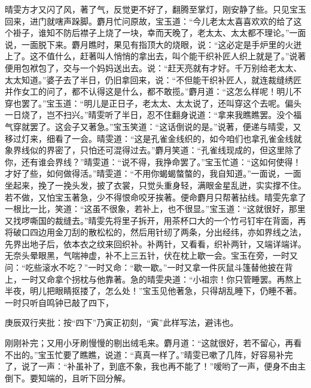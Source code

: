 \begin{parag}


    晴雯方才又闪了风，著了气，反觉更不好了，翻腾至掌灯，刚安静了些。只见宝玉回来，进门就嗐声跺脚。麝月忙问原故，宝玉道：“今儿老太太喜喜欢欢的给了这个褂子，谁知不防后襟子上烧了一块，幸而天晚了，老太太、太太都不理论。”一面说，一面脱下来。麝月瞧时，果见有指顶大的烧眼，说：“这必定是手炉里的火迸上了。这不值什么，赶著叫人悄悄的拿出去，叫个能干织补匠人织上就是了。”说著便用包袱包了，交与一个妈妈送出去。说：“赶天亮就有才好。千万别给老太太、太太知道。”婆子去了半日，仍旧拿回来，说：“不但能干织补匠人，就连裁缝绣匠并作女工的问了，都不认得这是什么，都不敢揽。”麝月道：“这怎么样呢！明儿不穿也罢了。”宝玉道：“明儿是正日子，老太太、太太说了，还叫穿这个去呢。偏头一日烧了，岂不扫兴。”晴雯听了半日，忍不住翻身说道：“拿来我瞧瞧罢。没个福气穿就罢了。这会子又著急。”宝玉笑道：“这话倒说的是。”说著，便递与晴雯，又移过灯来，细看了一会。晴雯道：“这是孔雀金线织的，如今咱们也拿孔雀金线就象界线似的界密了，只怕还可混得过去。”麝月笑道：“孔雀线现成的，但这里除了你，还有谁会界线？”晴雯道：“说不得，我挣命罢了。”宝玉忙道：“这如何使得！才好了些，如何做得活。”晴雯道：“不用你蝎蝎螫螫的，我自知道。”一面说，一面坐起来，挽了一挽头发，披了衣裳，只觉头重身轻，满眼金星乱迸，实实撑不住。若不做，又怕宝玉著急，少不得恨命咬牙挨著。便命麝月只帮著拈线。晴雯先拿了一根比一比，笑道：“这虽不很象，若补上，也不很显。”宝玉道：“这就很好，那里又找啰嘶国的裁缝去。”晴雯先将里子拆开，用茶杯口大的一个竹弓钉牢在背面，再将破口四边用金刀刮的散松松的，然后用针纫了两条，分出经纬，亦如界线之法，先界出地子后，依本衣之纹来回织补。补两针，又看看，织补两针，又端详端详。无奈头晕眼黑，气喘神虚，补不上三五针，伏在枕上歇一会。宝玉在旁，一时又问：“吃些滚水不吃？”一时又命：“歇一歇。”一时又拿一件灰鼠斗篷替他披在背上，一时又命拿个拐枕与他靠著。急的晴雯央道：“小祖宗！你只管睡罢。再熬上半夜，明儿把眼睛抠搂了，怎么处！”宝玉见他著急，只得胡乱睡下，仍睡不著。一时只听自鸣钟已敲了四下，\begin{note}庚辰双行夹批：按“四下”乃寅正初刻，“寅”此样写法，避讳也。\end{note}刚刚补完；又用小牙刷慢慢的剔出绒毛来。麝月道：“这就很好，若不留心，再看不出的。”宝玉忙要了瞧瞧，说道：“真真一样了。”晴雯已嗽了几阵，好容易补完了，说了一声：“补虽补了，到底不象，我也再不能了！”嗳哟了一声，便身不由主倒下。要知端的，且听下回分解。
\end{parag}
